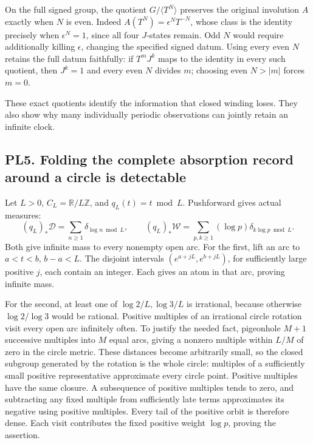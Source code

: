 On the full signed group, the quotient \(G/\langle T^N\rangle\)
preserves the original involution \(A\) exactly when \(N\) is even.
Indeed \(A(T^N)=\epsilon^NT^{-N}\), whose class is the identity
precisely when \(\epsilon^N=1\), since all four \(J\)-states remain. Odd
\(N\) would require additionally killing \(\epsilon\), changing the
specified signed datum. Using every even \(N\) retains the full datum
faithfully: if \(T^mJ^k\) maps to the identity in every such quotient,
then \(J^k=1\) and every even \(N\) divides \(m\); choosing even
\(N>|m|\) forces \(m=0\).

These exact quotients identify the information that closed winding
loses. They also show why many individually periodic observations can
jointly retain an infinite clock.

\subsection{PL5. Folding the complete absorption record around a circle
is
detectable}\label{pl5.-folding-the-complete-absorption-record-around-a-circle-is-detectable}

Let \(L>0\), \(C_L=\mathbb R/L\mathbb Z\), and \(q_L(t)=t\bmod L\).
Pushforward gives actual measures: \[
(q_L)_*\mathcal D=\sum_{n\ge1}\delta_{\log n\bmod L},\qquad
(q_L)_*\mathcal W=\sum_{p,k\ge1}(\log p)\delta_{k\log p\bmod L}.
\tag{PL5.1}
\] Both give infinite mass to every nonempty open arc. For the first,
lift an arc to \(a<t<b\), \(b-a<L\). The disjoint intervals
\((e^{a+jL},e^{b+jL})\), for sufficiently large positive \(j\), each
contain an integer. Each gives an atom in that arc, proving infinite
mass.

For the second, at least one of \(\log2/L,\log3/L\) is irrational,
because otherwise \(\log2/\log3\) would be rational. Positive multiples
of an irrational circle rotation visit every open arc infinitely often.
To justify the needed fact, pigeonhole \(M+1\) successive multiples into
\(M\) equal arcs, giving a nonzero multiple within \(L/M\) of zero in
the circle metric. These distances become arbitrarily small, so the
closed subgroup generated by the rotation is the whole circle: multiples
of a sufficiently small positive representative approximate every circle
point. Positive multiples have the same closure. A subsequence of
positive multiples tends to zero, and subtracting any fixed multiple
from sufficiently late terms approximates its negative using positive
multiples. Every tail of the positive orbit is therefore dense. Each
visit contributes the fixed positive weight \(\log p\), proving the
assertion.

